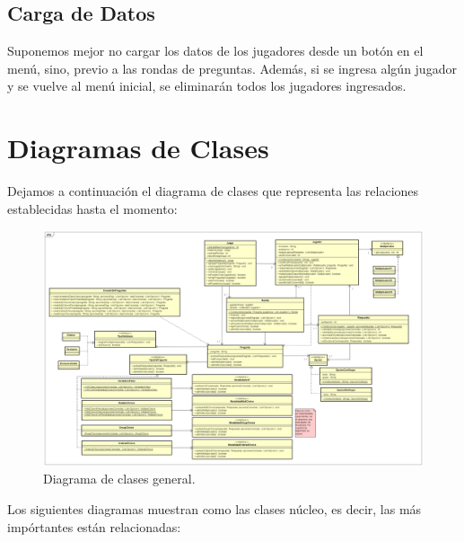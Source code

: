 \documentclass[titlepage,a4paper]{article}
\begin{document}
\subsection{Carga de Datos}

Suponemos mejor no cargar los datos de los jugadores desde un botón en el menú, sino, previo a 
las rondas de preguntas. Además, si se ingresa algún jugador y se vuelve al menú inicial, se eliminarán todos los jugadores ingresados.

\section{Diagramas de Clases}\label{sec:diagramasdeclase}

Dejamos a continuación el diagrama de clases que representa las relaciones establecidas hasta el momento:

\begin{figure}[H]
\centering
\includegraphics[width=1\textwidth]{img/UMLClases1.png}
\caption{\label{fig:class01}Diagrama de clases general.}
\end{figure}

\newpage
Los siguientes diagramas muestran como las clases núcleo, es decir, las más impórtantes están relacionadas:
\end{document}
